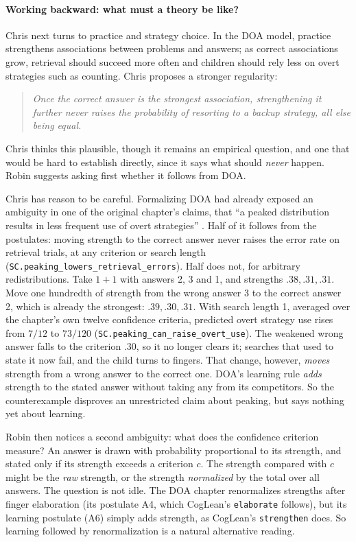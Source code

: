 \documentclass[11pt]{article}
\newcommand{\code}[1]{\texttt{#1}}
\newcommand{\lean}[1]{\texttt{#1}}
\begin{document}
\paragraph{Working backward: what must a theory be like?} Chris next turns to practice and strategy choice. In the DOA model, practice strengthens associations between problems and answers; as correct associations grow, retrieval should succeed more often and children should rely less on overt strategies such as counting. Chris proposes a stronger regularity:
\begin{quote}
\emph{Once the correct answer is the strongest association, strengthening it further never raises the probability of resorting to a backup strategy, all else being equal.}
\end{quote}
Chris thinks this plausible, though it remains an empirical question, and one that would be hard to establish directly, since it says what should \emph{never} happen. Robin suggests asking first whether it follows from DOA.

Chris has reason to be careful. Formalizing DOA had already exposed an ambiguity in one of the original chapter's claims, that ``a peaked distribution results in less frequent use of overt strategies'' \citep[p.~245]{siegler1984}. Half of it follows from the postulates: moving strength to the correct answer never raises the error rate on retrieval trials, at any criterion or search length (\lean{SC.peaking\_lowers\_retrieval\_errors}). Half does not, for arbitrary redistributions. Take $1+1$ with answers 2, 3 and 1, and strengths $.38, .31, .31$. Move one hundredth of strength from the wrong answer 3 to the correct answer 2, which is already the strongest: $.39, .30, .31$. With search length 1, averaged over the chapter's own twelve confidence criteria, predicted overt strategy use rises from $7/12$ to $73/120$ (\lean{SC.peaking\_can\_raise\_overt\_use}). The weakened wrong answer falls to the criterion $.30$, so it no longer clears it; searches that used to state it now fail, and the child turns to fingers. That change, however, \emph{moves} strength from a wrong answer to the correct one. DOA's learning rule \emph{adds} strength to the stated answer without taking any from its competitors. So the counterexample disproves an unrestricted claim about peaking, but says nothing yet about learning.

Robin then notices a second ambiguity: what does the confidence criterion measure? An answer is drawn with probability proportional to its strength, and stated only if its strength exceeds a criterion $c$. The strength compared with $c$ might be the \emph{raw} strength, or the strength \emph{normalized} by the total over all answers. The question is not idle. The DOA chapter renormalizes strengths after finger elaboration (its postulate A4, which CogLean's \code{elaborate} follows), but its learning postulate (A6) simply adds strength, as CogLean's \code{strengthen} does. So learning followed by renormalization is a natural alternative reading.
\end{document}
